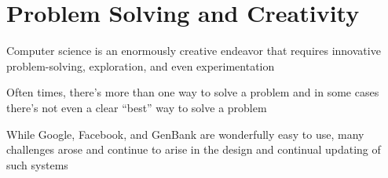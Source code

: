 \documentclass[8pt,a4paper,compress]{beamer}
\begin{document}
\section{Problem Solving and Creativity}
\begin{frame}[fragile]
\pause

Computer science is an enormously creative endeavor that requires innovative problem-solving, exploration, and even experimentation

\pause
\bigskip

Often times, there's more than one way to solve a problem and in some cases there's not even a clear ``best'' way to solve a problem

\pause
\bigskip

While Google, Facebook, and GenBank are wonderfully easy to use, many challenges arose and continue to arise in the design and continual updating of such systems
\end{frame}
\end{document}
